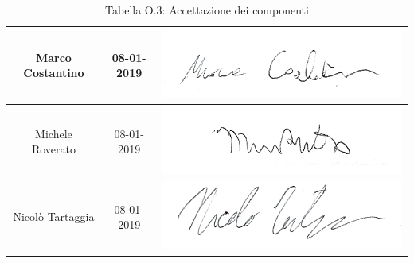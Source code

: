 \begin{table}[H]
\begin{center}
\begin{tabular}{| c | c | c |}
    Marco Costantino & 08-01-2019 & \includegraphics[align=c,scale=1]{Res/Firme/marco.png} \\ \hline
    Michele Roverato & 08-01-2019 & \includegraphics[align=c,scale=1]{Res/Firme/michele.png} \\ \hline
    Nicolò Tartaggia & 08-01-2019 & \includegraphics[align=c,scale=1]{Res/Firme/tartizz.png} \\ 
    \hline
  \end{tabular}
  \caption{Tabella O.3: Accettazione dei componenti\label{}}
\end{center}
\end{table}
\renewcommand{\arraystretch}{1}

